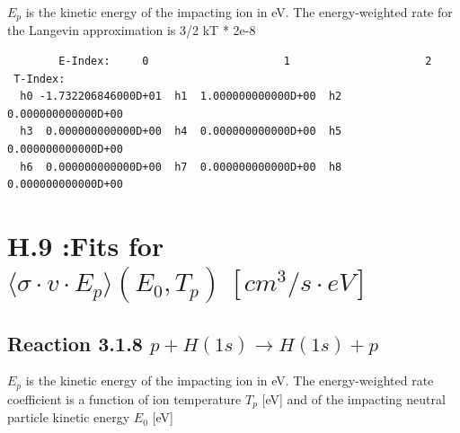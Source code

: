 \documentclass[12pt,dvipdfmx]{article}
\begin{document}
$E_p$ is the kinetic energy of the impacting ion in eV.
The energy-weighted rate for the Langevin approximation is
3/2 kT * 2e-8

\begin{small}\begin{verbatim}
        E-Index:     0                     1                     2
 T-Index:
  h0 -1.732206846000D+01  h1  1.000000000000D+00  h2  0.000000000000D+00
  h3  0.000000000000D+00  h4  0.000000000000D+00  h5  0.000000000000D+00
  h6  0.000000000000D+00  h7  0.000000000000D+00  h8  0.000000000000D+00

\end{verbatim}\end{small}

\newpage

\section{H.9 :Fits for $\langle\sigma \cdot v \cdot E_p \rangle (E_0,T_p) \ [cm^3/s
\cdot eV]$}

\subsection{
Reaction 3.1.8   $p + H(1s)  \rightarrow  H(1s) + p $
}
$E_p$ is the kinetic energy of the impacting ion in eV.
The energy-weighted rate coefficient is a function of ion temperature $T_p$
[eV]  and of the impacting neutral particle kinetic energy $E_0$ [eV]
\end{document}
